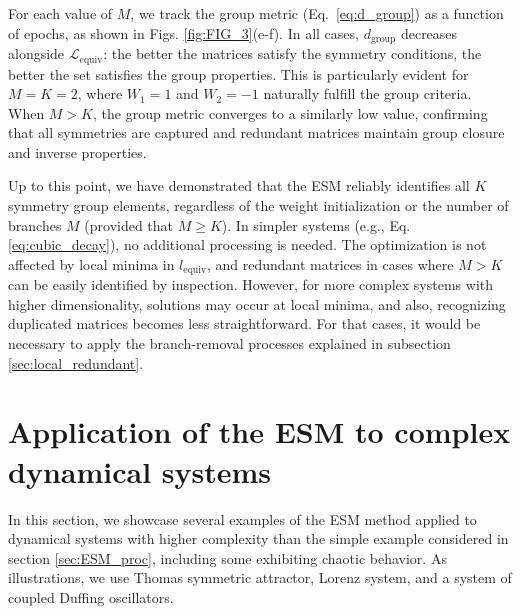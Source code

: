 
For each value of $M$, we track the group metric (Eq.~\ref{eq:d_group}) as a function of epochs, as shown in Figs. \ref{fig:FIG_3}(e-f). In all cases, $d_{\mathrm{group}}$ decreases alongside $\mathcal{L}_{\mathrm{equiv}}$: the better the matrices satisfy the symmetry conditions, the better the set satisfies the group properties. This is particularly evident for $M = K = 2$, where $W_1 = 1$ and $W_2 = -1$ naturally fulfill the group criteria. When $M > K$, the group metric converges to a similarly low value, confirming that all symmetries are captured and redundant matrices maintain group closure and inverse properties.




Up to this point, we have demonstrated that the ESM reliably identifies all $K$ symmetry group elements, regardless of the weight initialization or the number of branches $M$ (provided that $M \geq K$). In simpler systems (e.g., Eq. \ref{eq:cubic_decay}), no additional processing is needed. The optimization is not affected by local minima in $l_{\mathrm{equiv}}$, and redundant matrices in cases where $M > K$ can be easily identified by inspection. However, for more complex systems with higher dimensionality, solutions may occur at local minima, and also, recognizing duplicated matrices becomes less straightforward. For that cases, it would be necessary to apply the branch-removal processes explained in subsection \ref{sec:local_redundant}.





\section{Application of the ESM to complex dynamical systems}\label{sec:app_compl}


In this section, we showcase several examples of the ESM method applied to dynamical systems with higher complexity than the simple example considered in section \ref{sec:ESM_proc}, including some exhibiting chaotic behavior. As illustrations, we use Thomas symmetric attractor, Lorenz system, and a system of coupled Duffing oscillators.

